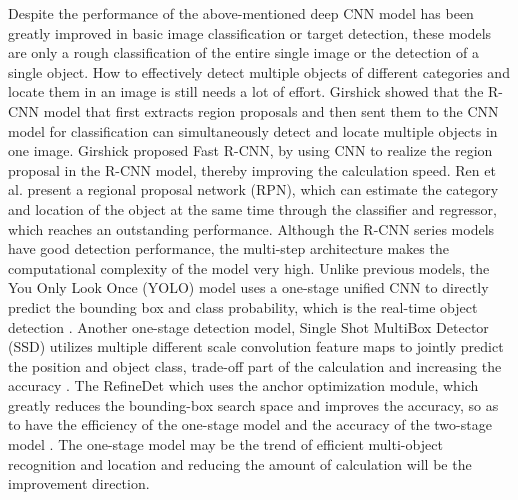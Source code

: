 \documentclass[10pt, a4paper]{IEEEtran} %
\begin{document}
Despite the performance of the above-mentioned deep CNN model has been greatly improved in basic image classification or target detection, these models are only a rough classification of the entire single image or the detection of a single object. How to effectively detect multiple objects of different categories and locate them in an image is still needs a lot of effort. Girshick \cite{girshick2014rich} showed that the R-CNN model that first extracts region proposals and then sent them to the CNN model for classification can simultaneously detect and locate multiple objects in one image. Girshick \cite{girshick2015fast} proposed Fast R-CNN, by using CNN to realize the region proposal in the R-CNN model, thereby improving the calculation speed. Ren et al. \cite{ren2015faster} present a regional proposal network (RPN), which can estimate the category and location of the object at the same time through the classifier and regressor, which reaches an outstanding performance. Although the R-CNN series models have good detection performance, the multi-step architecture makes the computational complexity of the model very high. Unlike previous models, the You Only Look Once (YOLO) model uses a one-stage unified CNN to directly predict the bounding box and class probability, which is the real-time object detection \cite{redmon2016you}. Another one-stage detection model, Single Shot MultiBox Detector (SSD) utilizes multiple different scale convolution feature maps to jointly predict the position and object class, trade-off part of the calculation and increasing the accuracy \cite{liu2016ssd}. The RefineDet which uses the anchor optimization module, which greatly reduces the bounding-box search space and improves the accuracy, so as to have the efficiency of the one-stage model and the accuracy of the two-stage model \cite{zhang2018single}. The one-stage model may be the trend of efficient multi-object recognition and location and reducing the amount of calculation will be the improvement direction.
	\par
\end{document}
